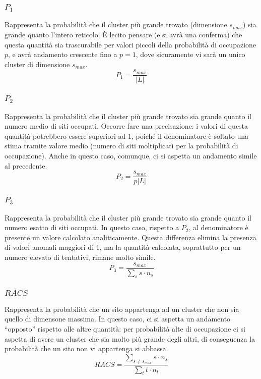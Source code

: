 \subsubsection*{$P_1$}
Rappresenta la probabilità che il cluster più grande trovato (dimensione $s_{max}$) sia grande 
quanto l'intero reticolo. È lecito pensare (e si avrà una conferma) che questa quantità sia 
trascurabile per valori piccoli della probabilità di occupazione $p$, e avrà andamento crescente
fino a $p=1$, dove sicuramente vi sarà un unico cluster di dimensione $s_{max}$.
\begin{equation}
    P_1=\frac{s_{max}}{|L|}
\end{equation}
\subsubsection*{$P_2$}
Rappresenta la probabilità che il cluster più grande trovato sia grande 
quanto il numero medio di siti occupati. Occorre fare una precisazione:
i valori di questa quantità potrebbero essere superiori ad 1, poiché il 
denominatore è soltato una stima tramite valore medio (numero di siti 
moltiplicati per la probabilità di occupazione).
Anche in questo caso, comunque, ci si aspetta un andamento simile al precedente.
\begin{equation}
    P_2=\frac{s_{max}}{p |L|}
\end{equation}
\subsubsection*{$P_3$}
Rappresenta la probabilità che il cluster più grande trovato sia grande 
quanto il numero esatto di siti occupati. In questo caso, rispetto a $P_2$,
al denominatore è presente un valore calcolato analiticamente. Questa differenza
elimina la presenza di valori anomali maggiori di 1, ma la quantità calcolata,
soprattutto per un numero elevato di tentativi, rimane molto simile.
\begin{equation}
    P_3 = \frac{s_{max}}{\sum_s s \cdot n_s}
\end{equation}
\subsubsection*{$RACS$}
Rappresenta la probabilità che un sito appartenga ad un cluster che non sia quello 
di dimensone massima. In questo caso, ci si aspetta un andamento ``opposto'' rispetto 
alle altre quantità: per probabilità alte di occupazione ci si aspetta di avere un cluster
che sia molto più grande degli altri, di conseguenza la probabilità che un sito non vi appartenga 
si abbassa.
\begin{equation}
    RACS = \frac{\sum_{s\neq s_{max}} s \cdot n_s}{\sum_t t \cdot n_t}
\end{equation}
